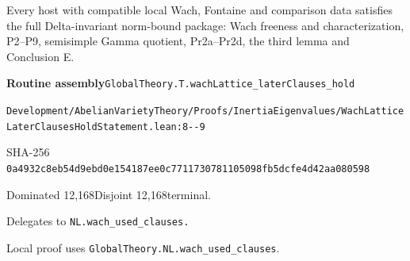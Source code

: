 
\begin{formalstatement}[D004]\label{decomp:D004}
Every host with compatible local Wach, Fontaine and comparison data satisfies the full Delta-invariant norm-bound package: Wach freeness and characterization, P2–P9, semisimple Gamma quotient, Pr2a–Pr2d, the third lemma and Conclusion E.
\end{formalstatement}
{\small\raggedright\noindent\textsf{\bfseries Routine assembly}\quad \nolinkurl{GlobalTheory.T.wachLattice_laterClauses_hold}\par\noindent \nolinkurl{Development/AbelianVarietyTheory/Proofs/InertiaEigenvalues/WachLatticeLaterClausesHoldStatement.lean:8--9}\par\noindent SHA-256 \nolinkurl{0a4932c8eb54d9ebd0e154187ee0c7711730781105098fb5dcfe4d42aa080598}\par\noindent Dominated 12,168\quad Disjoint 12,168\quad terminal.\par}
Delegates to \nolinkurl{NL.wach_used_clauses.}
{\small\raggedright Local proof uses \nolinkurl{GlobalTheory.NL.wach_used_clauses}.\par}
